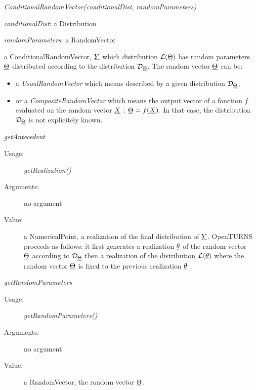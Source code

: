 \begin{description}

\item[Usage:] \textit{ConditionalRandomVector(conditionalDist, randomParameters)}

\item[Arguments:]  \rule{0pt}{1em}
\begin{description}
\item \textit{conditionalDist}: a Distribution
\item \textit{randomParameters}: a RandomVector
\end{description}

\item[Value:] a ConditionalRandomVector,  ${\underline{Y}}$ which distribution ${\mathcal L}({\underline{\Theta}})$ has random parameters ${\underline{\Theta}}$ distributed according to the distribution ${\mathcal D}_{{\underline{\Theta}}}$. The random vector  ${\underline{\Theta}}$ can be:
\begin{itemize}
\item a {\itshape UsualRandomVector} which means described by a given distribution ${\mathcal D}_{{\underline{\Theta}}}$,
\item or a {\itshape CompositeRandomVector} which means the output vector of a fonction $f$ evaluated on the random vector ${\underline{X}}$ : ${\underline{\Theta}} = f({\underline{X}})$. In that case, the distribution ${\mathcal D}_{{\underline{\Theta}}}$ is not explicitely known.
\end{itemize}

\item[Some methods:]  \rule{0pt}{1em}
\begin{description}

\item \textit{getAntecedent}
\begin{description}
\item[Usage:] \textit{getRealization()}
\item[Arguments:] no argument
\item[Value:] a NumericalPoint, a realization of the final distribution of ${\underline{Y}}$. OpenTURNS proceeds as follows: it first generates a realization ${\underline{\theta}}$  of the random vector  ${\underline{\Theta}}$ according to  ${\mathcal D}_{{\underline{\Theta}}}$ then a realization of the distribution ${\mathcal L}({\underline{\theta}})$ where the random vector ${\underline{\Theta}}$  is fixed to the previous realization ${\underline{\theta}}$ .\\
\end{description}
\bigskip

\item \textit{getRandomParameters}
\begin{description}
\item[Usage:] \textit{getRandomParameters()}
\item[Arguments:] no argument
\item[Value:] a RandomVector, the random vector ${\underline{\Theta}}$.
\end{description}
\bigskip


\end{description}
\end{description}
